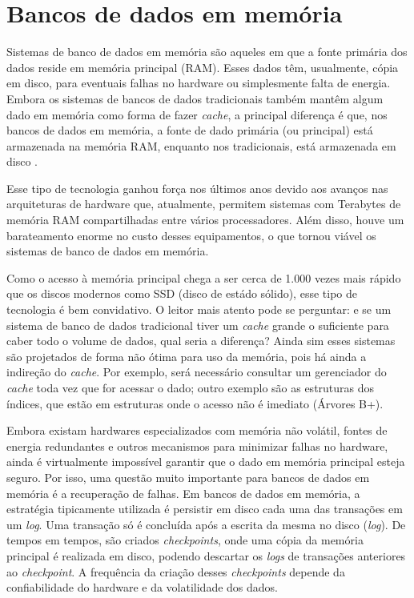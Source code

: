 \section{Bancos de dados em memória}
\label{sec:memoria}

Sistemas de banco de dados em memória são aqueles em que a fonte primária dos dados reside 
em memória principal (RAM). Esses dados têm, usualmente, cópia em disco, para eventuais falhas 
no hardware ou simplesmente falta de energia. Embora os sistemas de bancos de dados tradicionais 
também mantêm algum dado em memória como forma de fazer \textit{cache}, a principal diferença é 
que, nos bancos de dados em memória, a fonte de dado primária (ou principal) está 
armazenada na memória RAM, enquanto nos tradicionais, está armazenada em disco 
\cite{garcia1992main, dewitt1984implementation}.

Esse tipo de tecnologia ganhou força nos últimos anos devido aos avanços nas arquiteturas de 
hardware que, atualmente, permitem sistemas com Terabytes de memória RAM compartilhadas entre 
vários processadores. Além disso, houve um barateamento enorme no custo desses equipamentos, o 
que tornou viável os sistemas de banco de dados em memória. 

Como o acesso à memória principal chega a ser cerca de 1.000 vezes mais rápido que os discos modernos 
como SSD (disco de estádo sólido), esse tipo de tecnologia é bem convidativo. O leitor mais atento 
pode se perguntar: e se um sistema de banco de dados tradicional tiver um \textit{cache} grande o 
suficiente para caber todo o volume de dados, qual seria a diferença? Ainda sim esses sistemas são 
projetados de forma não ótima para uso da memória, pois há ainda a indireção do \textit{cache}. 
Por exemplo, será necessário consultar um gerenciador do \textit{cache} toda vez que for acessar o dado;
outro exemplo são as estruturas dos índices, que estão em estruturas onde o acesso não é imediato (Árvores B+). 

Embora existam hardwares especializados com memória não volátil, fontes de energia redundantes e 
outros mecanismos para minimizar falhas no hardware, ainda é virtualmente impossível garantir que o 
dado em memória principal esteja seguro. Por isso, uma questão muito importante para bancos de dados 
em memória é a recuperação de falhas. Em bancos de dados em memória, a estratégia tipicamente utilizada 
é persistir em disco cada uma das transações em um \textit{log}. Uma transação só é concluída após a 
escrita da mesma no disco (\textit{log}). De tempos em tempos, são criados \textit{checkpoints}, onde 
uma cópia da memória principal é realizada em disco, podendo descartar os \textit{logs} de transações 
anteriores ao \textit{checkpoint}. A frequência da criação desses \textit{checkpoints} depende da 
confiabilidade do hardware e da volatilidade dos dados.

